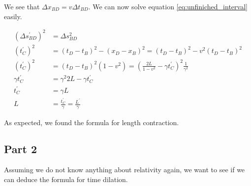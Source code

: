 \documentclass[a4paper,10pt,english]{article}
\begin{document}
\begin{enumerate}
We see that $\Delta x_{BD}=v\Delta t_{BD}$. We can now solve equation \ref{eq:unfiniched_interval} easily.

\begin{align*}
\left(\Delta s_{BD}^{\prime}\right)^{2}&=\Delta s_{BD}^{2}\\
\left(t_{C}^{\prime}\right)^{2}&=\left(t_{D}-t_{B}\right)^{2}-\left(x_{D}-x_{B}\right)^{2}=\left(t_{D}-t_{B}\right)^{2}-v^{2}\left(t_{D}-t_{B}\right)^{2}\\
\left(t_{C}^{\prime}\right)^{2}&=\left(t_{D}-t_{B}\right)^{2}\left(1-v^{2}\right)=\left(\frac{2L}{1-v^{2}}-\gamma t_{C}^{\prime}\right)^{2}\frac{1}{\gamma^{2}}\\
\gamma t_{C}^{\prime}&=\gamma^{2}2L-\gamma t_{C}^{\prime}\\
t_{C}^{\prime}&=\gamma L\\
L&=\frac{t_{C}^{\prime}}{\gamma}=\frac{L^{\prime}}{\gamma}
\end{align*}

As expected, we found the formula for length contraction.
\end{enumerate}

\subsection*{Part 2}
Assuming we do not know anything about relativity again, we want to see if we can deduce the formula for time dilation.
\end{document}
